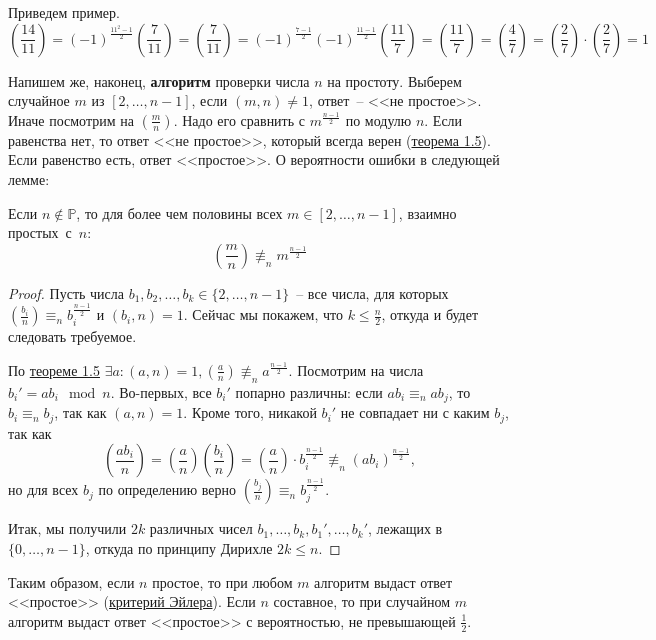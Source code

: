 Приведем пример.
$$\left(\frac{14}{11}\right) = (-1)^\frac{11^2-1}{2}\left(\frac{7}{11}\right) = \left(\frac{7}{11}\right) = (-1)^\frac{7-1}{2}(-1)^\frac{11-1}{2}\left(\frac{11}{7}\right) = \left(\frac{11}{7}\right) = \left(\frac{4}{7}\right) = \left(\frac{2}{7}\right)\cdot\left(\frac{2}{7}\right) = 1$$

Напишем же, наконец, \textbf{алгоритм} проверки числа $n$ на простоту. Выберем случайное $m$ из $[2,\ldots,n-1]$, если $(m,n)\ne 1$, ответ~-- <<не простое>>. Иначе посмотрим на $\left(\frac{m}{n}\right)$. Надо его сравнить с $m^{\frac{n-1}{2}}$ по модулю $n$. Если равенства нет, то ответ <<не простое>>, который всегда верен (\hyperlink{solovaytest}{теорема 1.5}). Если равенство есть, ответ <<простое>>. О вероятности ошибки в следующей лемме:
\begin{lemma} Если $n\not\in\mathbb{P}$, то для более чем половины всех $m \in [2, \ldots, n-1]$, взаимно простых~с~$n$: $$\left(\frac{m}{n}\right)\not\equiv_n m^{\frac{n-1}{2}}$$
\end{lemma}
\begin{proof}
Пусть числа $b_1, b_2, \ldots, b_k \in \{2, \ldots, n-1\}$~-- все числа, для которых $\left(\frac{b_i}{n}\right)\equiv_n b_i^\frac{n-1}{2}$ и $(b_i,n)=1$. Сейчас мы покажем, что $k \leq \frac{n}{2}$, откуда и будет следовать требуемое.

По \hyperlink{solovaytest}{теореме 1.5} $\exists a: (a,n)=1, (\frac{a}{n})\not\equiv_n a^\frac{n-1}{2}$. Посмотрим на  числа $b_i' = ab_i \mod {n}$. Во-первых, все $b_i'$ попарно различны: если $ab_i \equiv_n ab_j$, то $b_i \equiv_n b_j$, так как $(a,n)=1$. Кроме того, никакой $b_i'$ не совпадает ни с каким $b_j$, так как
$$\left(\frac{ab_i}{n}\right)=\left(\frac{a}{n}\right)\left(\frac{b_i}{n}\right)=\left(\frac{a}{n}\right)\cdot b_i^\frac{n-1}{2}\not\equiv_n (ab_i)^\frac{n-1}{2},$$
но для всех $b_j$ по определению верно $\left(\frac{b_j}{n}\right) \equiv_n b_j^\frac{n-1}{2}$.

Итак, мы получили $2k$ различных чисел $b_1, \ldots, b_k, b_1', \ldots, b_k'$, лежащих в $\{0, \ldots, n-1\}$, откуда по принципу Дирихле $2k \leq n$.
\end{proof}

Таким образом, если $n$ простое, то при любом $m$ алгоритм выдаст ответ <<простое>> (\hyperlink{euler}{критерий Эйлера}). Если $n$ составное, то при случайном $m$ алгоритм выдаст ответ <<простое>> с вероятностью, не превышающей $\frac{1}{2}$.
